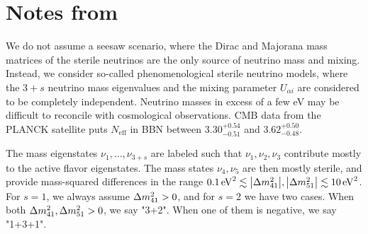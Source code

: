 \documentclass[twocolumn]{article}
\renewcommand{\a}{\ensuremath{\alpha}}
\renewcommand{\t}[1]{\ensuremath{\text{{#1}}}}
\newcommand*{\dm}[1][]{%
  \Delta m^2\ifx\\#1\\\else_\text{#1}\fi
}
\begin{document}
\section*{Notes from~\cite{kopp2013}}
We do not assume a seesaw scenario, where the Dirac and Majorana mass matrices of the sterile neutrinos are the only source of neutrino mass and mixing. Instead, we consider so-called phenomenological sterile neutrino models, where the $3+s$ neutrino mass eigenvalues and the mixing parameter $U_{\a i}$ are considered to be completely independent. 
Neutrino masses in excess of a few eV may be difficult to reconcile with cosmological observations. CMB data from the PLANCK satellite puts $N_\t{eff}$ in BBN between $3.30^{+0.54}_{-0.51}$ and $3.62^{+0.50}_{-0.48}$.

The mass eigenstates $\nu_1,\ldots, \nu_{3+s}$ are labeled such that $\nu_1, \nu_2, \nu_3$ contribute mostly to the active flavor eigenstates. The mass states $\nu_4, \nu_5$ are then mostly sterile, and provide mass-squared differences in the range $\SI{0.1}{eV^2} \lesssim \abs{\dm[41]}, \abs{\dm[51]} \lesssim \SI{10}{eV^2}$. For $s=1$, we always assume $\dm[41] > 0$, and for $s=2$ we have two cases. When both $\dm[41], \dm[51]>0$, we say "3+2". When one of them is negative, we say "1+3+1".
\end{document}
